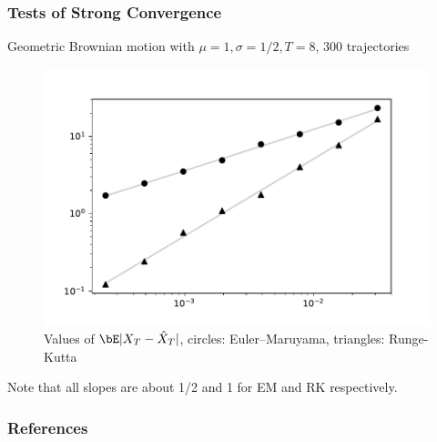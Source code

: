 \documentclass{beamer}
\begin{document}
\begin{frame}
\frametitle{Tests of Strong Convergence}
 Geometric Brownian motion with \( \mu = 1, \sigma = 1/2, T=8 \), 300 trajectories

\begin{figure}[ht!]\centering
    \includegraphics[width=.5\textwidth]{../img/strong_order_300.pdf}
    \caption{Values of \( \bE|X_T - \hat{X}_T| \), circles: Euler--Maruyama, triangles: Runge-Kutta}
\label{strong_order_test}
\end{figure}

Note that all slopes are about 1/2 and 1 for EM and RK respectively.
\end{frame}

\begin{frame}
\frametitle{References}
    {}
    
\end{frame}
\end{document}
